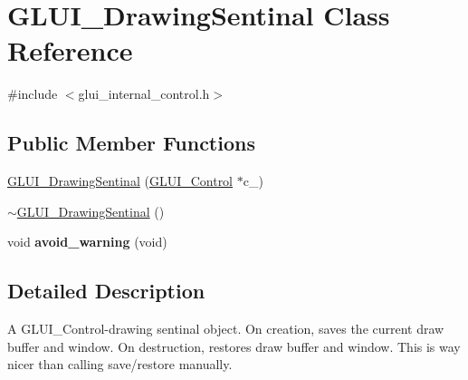 \hypertarget{class_g_l_u_i___drawing_sentinal}{\section{G\+L\+U\+I\+\_\+\+Drawing\+Sentinal Class Reference}
\label{class_g_l_u_i___drawing_sentinal}
}


{\ttfamily \#include $<$glui\+\_\+internal\+\_\+control.\+h$>$}

\subsection*{Public Member Functions}
\begin{DoxyCompactItemize}
\item 
\hyperlink{class_g_l_u_i___drawing_sentinal_a36a3e67bc912d8d6bb541d4cb5222d00}{G\+L\+U\+I\+\_\+\+Drawing\+Sentinal} (\hyperlink{class_g_l_u_i___control}{G\+L\+U\+I\+\_\+\+Control} $\ast$c\+\_\+)
\item 
\hyperlink{class_g_l_u_i___drawing_sentinal_a5d51d02a9b128b94552cf48d50af21f8}{$\sim$\+G\+L\+U\+I\+\_\+\+Drawing\+Sentinal} ()
\item 
\hypertarget{class_g_l_u_i___drawing_sentinal_a105eb4ebdb5793929029b42effb19ef3}{void {\bfseries avoid\+\_\+warning} (void)}\label{class_g_l_u_i___drawing_sentinal_a105eb4ebdb5793929029b42effb19ef3}

\end{DoxyCompactItemize}


\subsection{Detailed Description}
A G\+L\+U\+I\+\_\+\+Control-\/drawing sentinal object. On creation, saves the current draw buffer and window. On destruction, restores draw buffer and window. This is way nicer than calling save/restore manually. 

